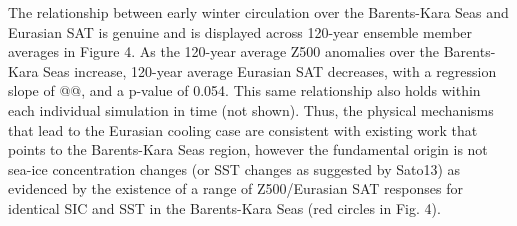 \documentclass[grl]{AGUTeX}  %
\begin{document}
\begin{article}
The relationship between early winter circulation over the Barents-Kara Seas and Eurasian SAT is genuine and is displayed across 120-year ensemble member averages in Figure 4. As the 120-year average Z500 anomalies over the Barents-Kara Seas increase, 120-year average Eurasian SAT decreases, with a regression slope of @@, and a p-value of 0.054. This same relationship also holds within each individual simulation in time (not shown). Thus, the physical mechanisms that lead to the Eurasian cooling case are consistent with existing work that points to the Barents-Kara Seas region, however the fundamental origin is not sea-ice concentration changes (or SST changes as suggested by Sato13) as evidenced by the existence of a range of Z500/Eurasian SAT responses for identical SIC and SST in the Barents-Kara Seas (red circles in Fig. 4). %

















\end{article}
\end{document}
